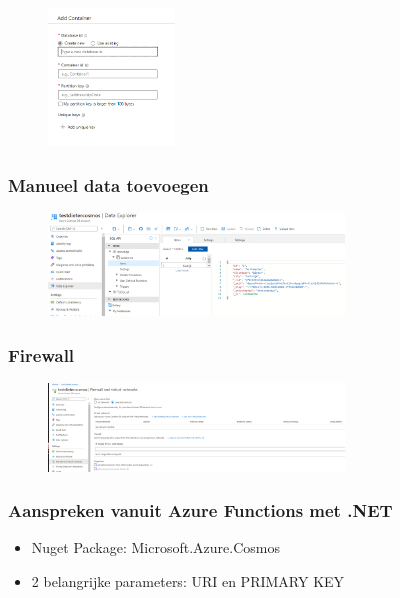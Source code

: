 \documentclass{article}
\begin{document}
\begin{figure}[H]
    \centering
    \includegraphics[width=0.3\textwidth]{cosmosdb-addcontainer.png}
    \caption{}
\end{figure}

\subsubsection{Manueel data toevoegen}

\begin{figure}[H]
    \centering
    \includegraphics[width=0.7\textwidth]{cosmosdb-adddata.png}
    \caption{}
\end{figure}

\subsubsection{Firewall}

\begin{figure}[H]
    \centering
    \includegraphics[width=0.7\textwidth]{cosmosdb-firewall.png}
    \caption{}
\end{figure}

\subsubsection{Aanspreken vanuit Azure Functions met .NET}

\begin{itemize}
    \item Nuget Package: Microsoft.Azure.Cosmos
    \item 2 belangrijke parameters: URI en PRIMARY KEY
\end{itemize}
\end{document}
